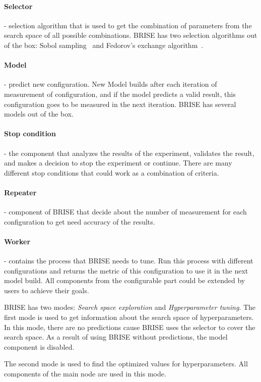 \paragraph{Selector} - selection algorithm that is used to get the combination of parameters from the search space of all possible combinations. BRISE has two selection algorithms out of the box: Sobol sampling~\cite{sobol99} and Fedorov's exchange algorithm~\cite{fedorov13}. 
\paragraph{Model} - predict new configuration. New Model builds after each iteration of measurement of configuration, and if the model predicts a valid result, this configuration goes to be measured in the next iteration. BRISE has several models out of the box.
\paragraph{Stop condition} - the component that analyzes the results of the experiment, validates the result, and makes a decision to stop the experiment or continue. There are many different stop conditions that could work as a combination of criteria.
\paragraph{Repeater} - component of BRISE that decide about the number of measurement for each configuration to get need accuracy of the results. 
\paragraph{Worker} - contains the process that BRISE needs to tune. Run this process with different configurations and returns the metric of this configuration to use it in the next model build.
All components from the configurable part could be extended by users to achieve their goals.

BRISE has two modes: \textit{Search space exploration} and \textit{Hyperparameter tuning}.
The first mode is used to get information about the search space of hyperparameters. In this mode, there are no predictions cause BRISE uses the selector to cover the search space. As a result of using BRISE without predictions, the model component is disabled.

The second mode is used to find the optimized values for hyperparameters. All components of the main node are used in this mode.

